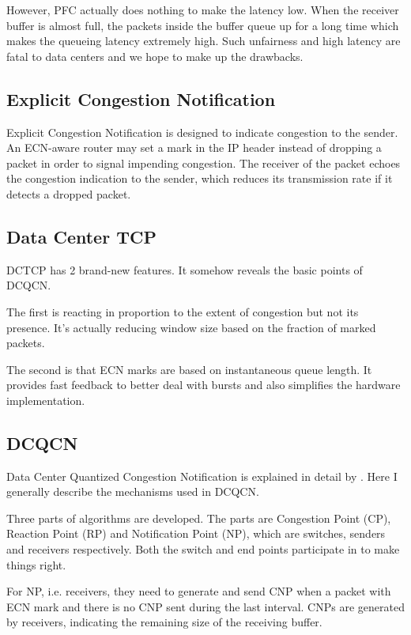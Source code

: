 \documentclass[12pt,a4paper]{article}
\begin{document}
However, PFC actually does nothing to make the latency low.
When the receiver buffer is almost full, the packets inside the buffer queue up for a long time which makes the queueing latency
extremely high.
Such unfairness and high latency are fatal to data centers and we hope to make up the drawbacks.

\subsection{Explicit Congestion Notification}
Explicit Congestion Notification is designed to indicate congestion to the sender.
An ECN-aware router may set a mark in the IP header instead of dropping a packet in order to signal impending congestion.
The receiver of the packet echoes the congestion indication to the sender,
which reduces its transmission rate if it detects a dropped packet.

\subsection{Data Center TCP}

DCTCP has 2 brand-new features. It somehow reveals the basic points of DCQCN.

The first is reacting in proportion to the extent of congestion but not its presence.
It's actually reducing window size based on the fraction of marked packets.

The second is that ECN marks are based on instantaneous queue length.
It provides fast feedback to better deal with bursts and also simplifies the hardware implementation.

\subsection{DCQCN}
Data Center Quantized Congestion Notification is explained in detail by \cite{dcqcn}.
Here I generally describe the mechanisms used in DCQCN.

Three parts of algorithms are developed.
The parts are Congestion Point (CP), Reaction Point (RP) and Notification Point (NP),
which are switches, senders and receivers respectively.
Both the switch and end points participate in to make things right.

For NP, i.e. receivers, they need to generate and send CNP when a packet with ECN mark and there is no CNP sent during the last interval.
CNPs are generated by receivers, indicating the remaining size of the receiving buffer.
\end{document}
